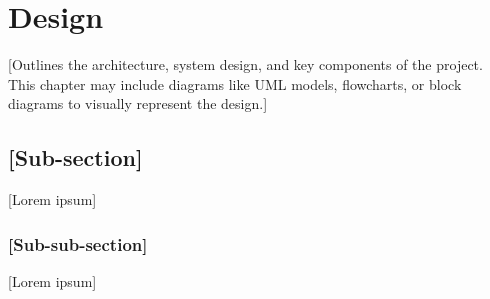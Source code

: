 \chapter{Design}
\label{chap:design}

[Outlines the architecture, system design, and key components of the project. This chapter may include diagrams like UML models, flowcharts, or block diagrams to visually represent the design.]

\section{[Sub-section]}
\label{sec:design_subsection}
[Lorem ipsum]

\subsection{[Sub-sub-section]}
\label{subsec:design_subsubsection}
[Lorem ipsum]

